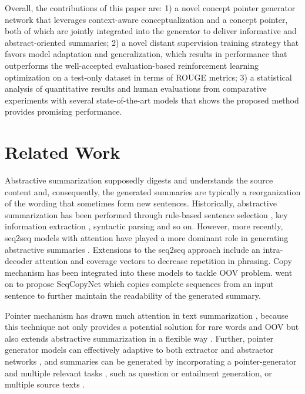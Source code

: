 \documentclass[11pt,a4paper]{article}
\begin{document}
Overall, the contributions of this paper are: 1) a novel concept pointer generator network that leverages context-aware conceptualization and a concept pointer, both of which are jointly integrated into the generator to deliver informative and abstract-oriented summaries; 2) a novel distant supervision training strategy that favors model adaptation and generalization, which results in performance that outperforms the well-accepted evaluation-based reinforcement learning optimization on a test-only dataset in terms of ROUGE metrics; 3) a statistical analysis of quantitative results and human evaluations from comparative experiments with several state-of-the-art models that shows the proposed method provides promising performance.


 




  


\section{Related Work}
\label{sec:relatedwork}


Abstractive summarization supposedly digests and understands the source content and, consequently, the generated summaries are typically a reorganization of the wording that sometimes form new sentences. 
Historically, abstractive summarization has been performed through rule-based sentence selection \cite{dorr2003hedge}, key information extraction  \cite{DBLP:conf/acl/GenestL11}, syntactic parsing \cite{DBLP:conf/acl/BingLLLGP15} and so on. However, more recently, seq2seq models with attention have played a more dominant role in generating abstractive summaries \cite{DBLP:conf/emnlp/RushCW15,Chopra2016Abstractive,DBLP:conf/conll/NallapatiZSGX16,DBLP:conf/acl/ZhouYWZ17}.  Extensions to the seq2seq approach include an intra-decoder attention \cite{paulus2017deep} and coverage vectors  \cite{DBLP:conf/acl/SeeLM17} to decrease repetition in phrasing. 
Copy mechanism \cite{gu2016incorporating}
has been integrated into these models to tackle OOV problem.  
\citet{DBLP:conf/aaai/ZhouYWZ18} went on to propose SeqCopyNet  which copies  complete sequences from an input sentence to further maintain the readability of the generated summary. 

 
Pointer mechanism \cite{vinyals2015pointer} has drawn 
much attention in text summarization \cite{DBLP:conf/acl/SeeLM17}, because this technique not only provides a potential solution for rare words and OOV  but also  extends abstractive summarization in a flexible way \cite{DBLP:conf/naacl/CelikyilmazBHC18}. 
Further, pointer generator models can effectively adaptive to both extractor and abstractor networks \cite{chen2018fast},  
and summaries can be generated by incorporating a pointer-generator and multiple relevant tasks \cite{DBLP:conf/acl/BansalPG18}, such as question or entailment generation, or  multiple source texts \cite{sun2018multi}.
\end{document}

